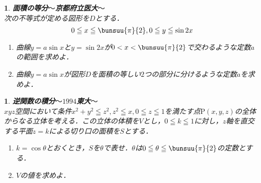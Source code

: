 \documentclass[10pt,
fleqn,
dvipdfmx,
uplatex
]{jsarticle}
\newtheorem{question}[Question]{}
\begin{document}
\begin{question}{\bf\boldmath 面積の等分$〜$京都府立医大$〜$}\\
次の不等式が定める図形を$D$とする．
\[0\leqq x\leqq \bunsuu{\pi }{2},0\leqq y\leqq \sin 2x\]
\begin{enumerate}
\item 曲線$y=a\sin x$と$y=\sin 2x$が$0<x<\bunsuu{\pi }{2}$で交わるような定数$a$の範囲を求めよ．
\item 曲線$y=a\sin x$が図形$D$を面積の等しい$2$つの部分に分けるような定数$a$を求めよ．
\end{enumerate}

\end{question}



\begin{question}{\bf\boldmath 逆関数の積分$〜1994$東大$〜$}\\
$xyz$空間において条件$x^2+y^2\leqq z^2, z^2\leqq x, 0\leqq z\leqq 1$を満たす点$\text{P}\left(x,y,z\right)$の全体からなる立体を考える．この立体の体積を$V$とし，$0\leqq k\leqq 1$に対し，$z$軸を直交する平面$z=k$による切り口の面積を$S$とする．
\begin{enumerate}
\item $k=\cos \theta$とおくとき，$S$を$\theta$で表せ．$\theta$は$0\leqq \theta \leqq \bunsuu{\pi }{2}$の定数とする．
\item $V$の値を求めよ．
\end{enumerate}

\end{question}
\end{document}
